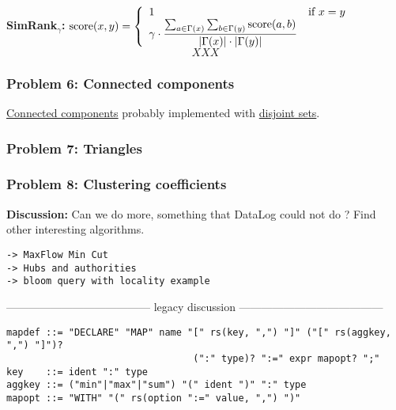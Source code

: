 \documentclass[11pt]{article}
\newlength{\dlen}
\def\discuss#1{\par\hspace{2em}
\setlength{\dlen}{\textwidth}
\addtolength{\dlen}{-2em}
\begin{minipage}{\dlen}\footnotesize {\bf\color{red} Discussion:} #1\end{minipage}\par}
\begin{document}
{\bf SimRank${}_\gamma$:} ${\rm score}(x,y)=\left\{\begin{array}{ll}1&\text{if }x=y\\
	\gamma\cdot\dfrac{\sum_{a\in\Gamma(x)}\sum_{b\in\Gamma(y)} {\rm score}(a,b)}
			{|\Gamma(x)| \cdot |\Gamma(y)|} \end{array}\right.$
\[
XXX
\]

\subsubsection*{Problem 6: Connected components}
\href{http://en.wikipedia.org/wiki/Connected_component_(graph_theory)}{Connected components} probably implemented with \href{http://en.wikipedia.org/wiki/Disjoint-set_data_structure}{disjoint sets}.

\subsubsection*{Problem 7: Triangles}

\subsubsection*{Problem 8: Clustering coefficients}

\discuss{Can we do more, something that DataLog could not do ? Find other interesting algorithms.}

\begin{verbatim}
-> MaxFlow Min Cut
-> Hubs and authorities
-> bloom query with locality example
\end{verbatim}

{\center --------------------------------------- legacy discussion ---------------------------------------}
\begin{verbatim}
mapdef ::= "DECLARE" "MAP" name "[" rs(key, ",") "]" ("[" rs(aggkey, ",") "]")? 
                                 (":" type)? ":=" expr mapopt? ";" 
key    ::= ident ":" type
aggkey ::= ("min"|"max"|"sum") "(" ident ")" ":" type
mapopt ::= "WITH" "(" rs(option ":=" value, ",") ")"
\end{verbatim}
\end{document}
